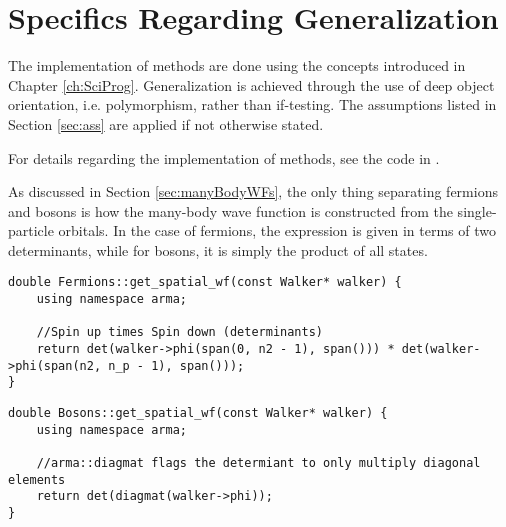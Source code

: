 
\clearpage
\section{Specifics Regarding Generalization}

The implementation of methods are done using the concepts introduced in Chapter \ref{ch:SciProg}. Generalization is achieved through the use of deep object orientation, i.e. polymorphism, rather than if-testing. The assumptions listed in Section \ref{sec:ass} are applied if not otherwise stated.

For details regarding the implementation of methods, see the code in \cite{libBorealisCode}.


As discussed in Section \ref{sec:manyBodyWFs}, the only thing separating fermions and bosons is how the many-body wave function is constructed from the single-particle orbitals. In the case of fermions, the expression is given in terms of two determinants, while for bosons, it is simply the product of all states.

\begin{lstlisting}
double Fermions::get_spatial_wf(const Walker* walker) {
    using namespace arma;
    
    //Spin up times Spin down (determinants)
    return det(walker->phi(span(0, n2 - 1), span())) * det(walker->phi(span(n2, n_p - 1), span()));
}
\end{lstlisting}

\begin{lstlisting}
double Bosons::get_spatial_wf(const Walker* walker) {
    using namespace arma;
    
    //arma::diagmat flags the determiant to only multiply diagonal elements
    return det(diagmat(walker->phi));
}
\end{lstlisting}
